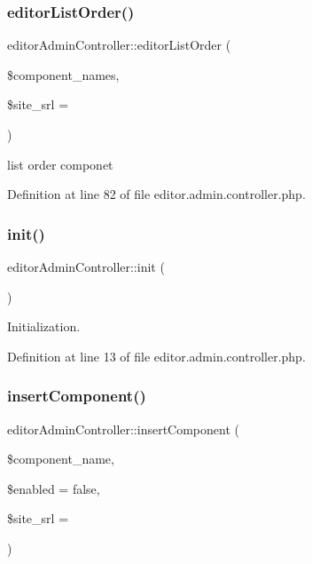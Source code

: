 \subsubsection{\texorpdfstring{editor\+List\+Order()}{editorListOrder()}}
{\footnotesize\ttfamily editor\+Admin\+Controller\+::editor\+List\+Order (\begin{DoxyParamCaption}\item[{}]{\$component\+\_\+names,  }\item[{}]{\$site\+\_\+srl = {} }\end{DoxyParamCaption})}



list order componet 



Definition at line 82 of file editor.\+admin.\+controller.\+php.

\mbox{\label{classeditorAdminController_ad93d747ea21b3414d423dcb8b3b54760}} 
\subsubsection{\texorpdfstring{init()}{init()}}
{\footnotesize\ttfamily editor\+Admin\+Controller\+::init (\begin{DoxyParamCaption}{ }\end{DoxyParamCaption})}



Initialization. 



Definition at line 13 of file editor.\+admin.\+controller.\+php.

\mbox{\label{classeditorAdminController_a38775ee5db2277eb943096661ae25fd9}} 
\subsubsection{\texorpdfstring{insert\+Component()}{insertComponent()}}
{\footnotesize\ttfamily editor\+Admin\+Controller\+::insert\+Component (\begin{DoxyParamCaption}\item[{}]{\$component\+\_\+name,  }\item[{}]{\$enabled = {\ttfamily false},  }\item[{}]{\$site\+\_\+srl = {} }\end{DoxyParamCaption})}



